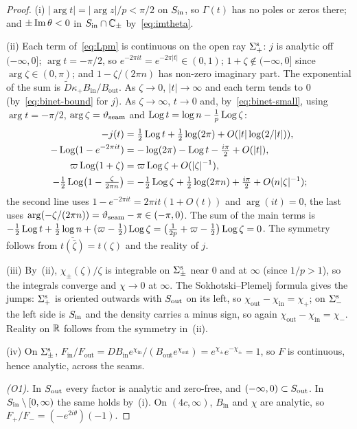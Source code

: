 \begin{proof}
(i) $|\arg t|=|\arg z|/p<\pi/2$ on $S_{\mathrm{in}}$, so $\Gamma(t)$ has no poles or zeros there; and $\pm\operatorname{Im}\theta<0$ in
$S_{\mathrm{in}}\cap\mathbb{C}_\pm$ by~\eqref{eq:imtheta}.

(ii) Each term of~\eqref{eq:Lpm} is continuous on the open ray $\Sigma^{\mathrm{s}}_+$: $j$ is analytic off $(-\infty,0]$;
$\arg t=-\pi/2$, so $e^{-2\pi it}=e^{-2\pi|t|}\in(0,1)$; $1+\zeta\notin(-\infty,0]$ since $\arg\zeta\in(0,\pi)$; and
$1-\zeta/(2\pi n)$ has non-zero imaginary part. The exponential of the sum is $\tilde D\kappa_+B_{\mathrm{in}}/B_{\mathrm{out}}$.
As $\zeta\to0$, $|t|\to\infty$ and each term tends to $0$ (by~\eqref{eq:binet-bound} for $j$). As $\zeta\to\infty$,
$t\to0$ and, by~\eqref{eq:binet-small}, using $\arg t=-\pi/2$, $\arg\zeta=\vartheta_{\mathrm{seam}}$ and $\operatorname{Log} t=\log n-\frac1p\operatorname{Log}\zeta$:
\begin{align*}
  -j(t)&=\tfrac12\operatorname{Log} t+\tfrac12\log(2\pi)+O(|t|\log(2/|t|)),\\
  -\operatorname{Log}(1-e^{-2\pi it})&=-\log(2\pi)-\operatorname{Log} t-\tfrac{i\pi}2+O(|t|),\\
  \varpi\operatorname{Log}(1+\zeta)&=\varpi\operatorname{Log}\zeta+O(|\zeta|^{-1}),\\
  -\tfrac12\operatorname{Log}\bigl(1-\tfrac\zeta{2\pi n}\bigr)&=-\tfrac12\operatorname{Log}\zeta+\tfrac12\log(2\pi n)+\tfrac{i\pi}2+O(n|\zeta|^{-1});
\end{align*}
the second line uses $1-e^{-2\pi it}=2\pi it(1+O(t))$ and $\arg(it)=0$, the last uses
$\arg(-\zeta/(2\pi n))=\vartheta_{\mathrm{seam}}-\pi\in(-\pi,0)$. The sum of the main terms is
$-\frac12\operatorname{Log} t+\frac12\log n+(\varpi-\frac12)\operatorname{Log}\zeta=\bigl(\frac1{2p}+\varpi-\frac12\bigr)\operatorname{Log}\zeta=0$. The symmetry
follows from $\overline{t(\bar\zeta)}=t(\zeta)$ and the reality of $j$.

(iii) By~(ii), $\chi_\pm(\zeta)/\zeta$ is integrable on $\Sigma^{\mathrm{s}}_\pm$ near $0$ and at $\infty$ (since $1/p>1$), so the
integrals converge and $\chi\to0$ at $\infty$. The Sokhotski--Plemelj formula gives the jumps: $\Sigma^{\mathrm{s}}_+$ is oriented
outwards with $S_{\mathrm{out}}$ on its left, so $\chi_{\mathrm{out}}-\chi_{\mathrm{in}}=\chi_+$; on $\Sigma^{\mathrm{s}}_-$ the left side is
$S_{\mathrm{in}}$ and the density carries a minus sign, so again $\chi_{\mathrm{out}}-\chi_{\mathrm{in}}=\chi_-$. Reality on $\mathbb{R}$
follows from the symmetry in~(ii).

(iv) On $\Sigma^{\mathrm{s}}_\pm$, $F_{\mathrm{in}}/F_{\mathrm{out}}=DB_{\mathrm{in}}e^{\chi_{\mathrm{in}}}/(B_{\mathrm{out}}e^{\chi_{\mathrm{out}}})
=e^{\chi_\pm}e^{-\chi_\pm}=1$, so $F$ is continuous, hence analytic, across the seams.

\emph{(O1).} In $S_{\mathrm{out}}$ every factor is analytic and zero-free, and $(-\infty,0)\subset S_{\mathrm{out}}$. In $S_{\mathrm{in}}\setminus[0,\infty)$
the same holds by~(i). On $(4c,\infty)$, $B_{\mathrm{in}}$ and $\chi$ are analytic, so $F_+/F_-=(-e^{2i\theta})(-1)$.


\end{proof}
